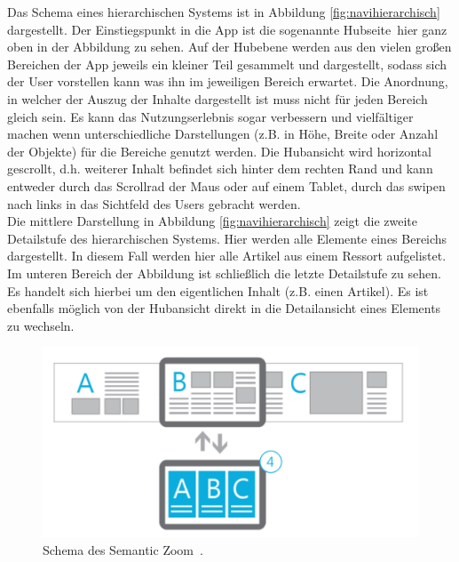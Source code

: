 \documentclass[12pt,a4paper,bibtotoc]{scrartcl}
\begin{document}
Das Schema eines hierarchischen Systems ist in Abbildung \ref{fig:navihierarchisch} dargestellt. Der Einstiegspunkt in die App ist die sogenannte \glqq Hubseite\grqq\, hier ganz oben in der Abbildung zu sehen. Auf der Hubebene werden aus den vielen großen Bereichen der App jeweils ein kleiner Teil gesammelt und dargestellt, sodass sich der User vorstellen kann was ihn im jeweiligen Bereich erwartet. Die Anordnung, in welcher der Auszug der Inhalte dargestellt ist muss nicht für jeden Bereich gleich sein. Es kann das Nutzungserlebnis sogar verbessern und vielfältiger machen wenn unterschiedliche Darstellungen (z.B. in Höhe, Breite oder Anzahl der Objekte) für die Bereiche genutzt werden. Die Hubansicht wird horizontal gescrollt, d.h. weiterer Inhalt befindet sich hinter dem rechten Rand und kann entweder durch das Scrollrad der Maus oder auf einem Tablet, durch das swipen nach links in das Sichtfeld des Users gebracht werden.\\
Die mittlere Darstellung in Abbildung \ref{fig:navihierarchisch} zeigt die zweite Detailstufe des hierarchischen Systems. Hier werden alle Elemente eines Bereichs dargestellt. In diesem Fall werden hier alle Artikel aus einem Ressort aufgelistet.\\
Im unteren Bereich der Abbildung ist schließlich die letzte Detailstufe zu sehen. Es handelt sich hierbei um den eigentlichen Inhalt (z.B. einen Artikel). Es ist ebenfalls möglich von der Hubansicht direkt in die Detailansicht eines Elements zu wechseln.  

\begin{figure}[h]	
	\centering
	\includegraphics[scale=1]{Bilder/Abbildungen/ms_navigation_hierarchie_semantic_zoom} 
	\caption{Schema des \glqq Semantic Zoom\grqq\ \protect\citep{MicrosoftNavidesign2013}.}
	\label{fig:semanticzoomkonzept}
\end{figure}
\end{document}
